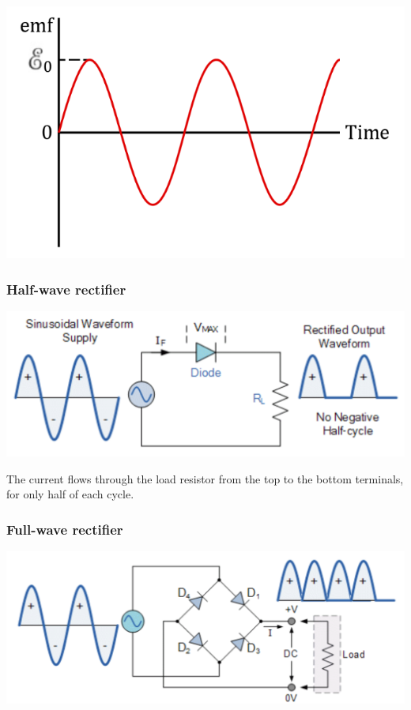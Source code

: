 \documentclass[11pt]{article}
\begin{document}
\begin{center}
\includegraphics[scale=0.7]{./images/ac-generator-graph.png}
\end{center}

\subsubsection{Half-wave rectifier}
\label{sec:org6569db1}
\begin{center}
\includegraphics[width=.9\linewidth]{./images/half-wave-rectifier.png}
\end{center}

The current flows through the load resistor from the top to the bottom terminals, for only half of each cycle.

\subsubsection{Full-wave rectifier}
\label{sec:org7cb0257}
\begin{center}
\includegraphics[width=.9\linewidth]{./images/full-wave-rectifier.png}
\end{center}
\end{document}
